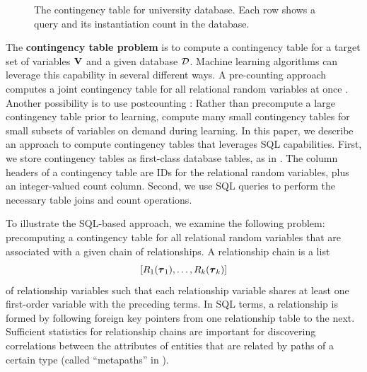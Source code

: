 \documentclass{acm_proc_article-sp}
\newcommand{\ct}{\mathit{ct}}
\begin{document}
\begin{figure}[htbp]
\begin{center}
\caption{The contingency table for university database. %
Each row shows a query and its instantiation count in the database.
\label{fig:ct}}
\end{center}
\end{figure}


The \textbf{contingency table problem} is to compute a contingency table for a target set of variables $\mathbf{V} $ and a given database $\mathcal{D}$. Machine learning algorithms can leverage this capability in several different ways. A pre-counting approach computes a joint contingency table for all relational random variables at once \cite{Moore1998,Qian2014a}. Another possibility is to use postcounting \cite{lv2012}: Rather than precompute a large contingency table prior to learning, compute many small contingency tables for  small subsets of variables on demand during learning. In this paper, we describe an approach to compute contingency tables that leverages SQL capabilities. First, we store contingency tables as first-class database tables, as in \cite{Qian2014a}. The column headers of a contingency table are IDs for the relational random variables, plus an integer-valued count column. Second, we use SQL queries to perform the necessary table joins and count operations. 



To illustrate the SQL-based approach, we examine the following problem: precomputing a contingency table for all relational random variables that are associated with a given chain of relationships. A relationship chain is a list $$[R_{1}(\boldsymbol{\tau}_{1}),\ldots,R_{k}(\boldsymbol{\tau}_{k})]$$
 of relationship variables such that each relationship variable shares at least one first-order variable with the preceding terms. In SQL terms, a relationship is formed by following foreign key pointers from one relationship table to the next. Sufficient statistics for relationship chains are important for discovering correlations between the attributes of entities that are related by paths of a certain type \cite{Getoor2007c} (called ``metapaths'' in \cite{Sun2012}). 
 
\end{document}
